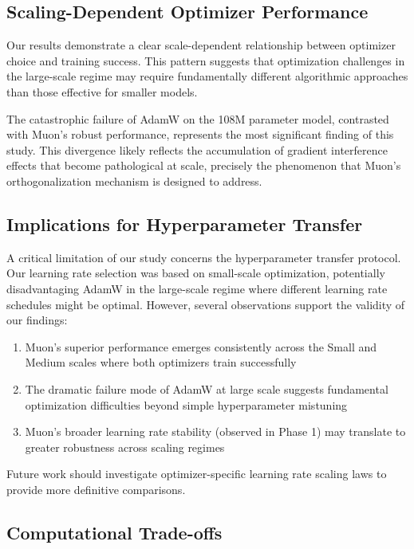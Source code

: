 \documentclass[11pt,a4paper]{article}
\begin{document}
\subsection{Scaling-Dependent Optimizer Performance}

Our results demonstrate a clear scale-dependent relationship between optimizer choice and training success. This pattern suggests that optimization challenges in the large-scale regime may require fundamentally different algorithmic approaches than those effective for smaller models.

The catastrophic failure of AdamW on the 108M parameter model, contrasted with Muon's robust performance, represents the most significant finding of this study. This divergence likely reflects the accumulation of gradient interference effects that become pathological at scale, precisely the phenomenon that Muon's orthogonalization mechanism is designed to address.

\subsection{Implications for Hyperparameter Transfer}

A critical limitation of our study concerns the hyperparameter transfer protocol. Our learning rate selection was based on small-scale optimization, potentially disadvantaging AdamW in the large-scale regime where different learning rate schedules might be optimal. However, several observations support the validity of our findings:

\begin{enumerate}[leftmargin=*]
    \item Muon's superior performance emerges consistently across the Small and Medium scales where both optimizers train successfully
    \item The dramatic failure mode of AdamW at large scale suggests fundamental optimization difficulties beyond simple hyperparameter mistuning
    \item Muon's broader learning rate stability (observed in Phase 1) may translate to greater robustness across scaling regimes
\end{enumerate}

Future work should investigate optimizer-specific learning rate scaling laws to provide more definitive comparisons.

\subsection{Computational Trade-offs}
\end{document}
